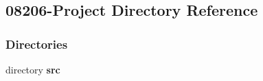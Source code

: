 \subsection{08206-\/\+Project Directory Reference}
\label{dir_da5c18d34ed33991a552d6a9eee735b5}
\subsubsection*{Directories}
\begin{DoxyCompactItemize}
\item 
directory \textbf{ src}
\end{DoxyCompactItemize}
